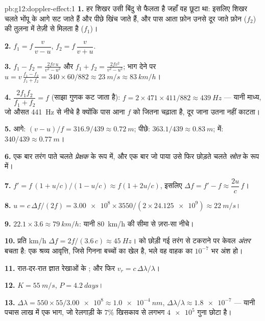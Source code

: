 \begin{solution}{pb:g12:doppler-effect:1}
\textbf{1.} हर शिखर उसी बिंदु से फैलता है जहाँ वह छूटा था: इसलिए शिखर चलते
भोंपू के आगे सट जाते हैं और पीछे खिंच जाते हैं, और पास आता फ़ोन उनसे दूर जाते
फ़ोन ($f_2$) की तुलना में तेज़ी से मिलता है ($f_1$)।

\textbf{2.} $f_1 = f\,\dfrac{v}{v - u}$, \quad $f_2 = f\,\dfrac{v}{v + u}$.

\textbf{3.} $f_1 - f_2 = \frac{2fv\,u}{v^2 - u^2}$ और $f_1 + f_2 =
\frac{2fv^2}{v^2 - u^2}$; भाग देने पर $u = v\,\frac{f_1 - f_2}{f_1 + f_2} =
340 \times 60/882 \approx \qty{23}{m/s} \approx \qty{83}{km/h}$।

\textbf{4.} $\dfrac{2f_1 f_2}{f_1 + f_2} = f$ (साझा गुणक कट जाता है): $f = 2 \times 471 \times 411/882 \approx \qty{439}{Hz}$ --- यानी 
माध्य, जो औसत \qty{441}{Hz} से नीचे है क्योंकि पास आना $f$ को जितना चढ़ाता है,
दूर जाना उतना नहीं काटता।

\textbf{5.} आगे: $(v - u)/f = 316.9/439 \approx \qty{0.72}{m}$; पीछे: $363.1/439 \approx \qty{0.83}{m}$;  में: $340/439 \approx \qty{0.77}{m}$।

\textbf{6.} एक बार तरंग पाते चलते \emph{प्रेक्षक} के रूप में, और एक
बार जो पाया उसे फिर छोड़ते चलते \emph{स्रोत} के रूप में।

\textbf{7.} $f' = f\,(1 + u/c)/(1 - u/c) \approx f(1 + 2u/c)$, इसलिए $\Delta f = f' - f \approx \dfrac{2u}{c}\,f$।

\textbf{8.} $u = c\,\Delta f/(2f) = \num{3.00e8} \times 3550/(2 \times \num{24.125e9})
\approx \qty{22}{m/s}$।

\textbf{9.} $22.1 \times 3.6 \approx \qty{79}{km/h}$: यानी \qty{80}{km/h} की सीमा से ज़रा-सा नीचे।

\textbf{10.} प्रति \unit{km/h} $\Delta f = 2f/(3.6\,c) \approx \qty{45}{Hz}$।  को छोड़ी गई
तरंग से टकराने पर केवल \emph{अंतर} बचता है: एक श्रव्य
आवृत्ति, जिसे गिनना बच्चों का खेल है, भले वह वाहक का $10^{-7}$ भर अंश
हो।

\textbf{11.} रात-दर-रात ज्ञात  रेखाओं के
; और फिर $v_r = c\,\Delta\lambda/\lambda$।

\textbf{12.} $K = \qty{55}{m/s}$, $P = \qty{4.2}{days}$।

\textbf{13.} $\Delta\lambda = 550 \times 55/\num{3.00e8} \approx \qty{1.0e-4}{nm}$, $\Delta\lambda/\lambda \approx \num{1.8e-7}$ --- यानी पचास लाख में एक भाग, जो रेलगाड़ी के
$7\%$ खिसकाव से लगभग $\num{4e5}$ गुना छोटा है।


\end{solution}

